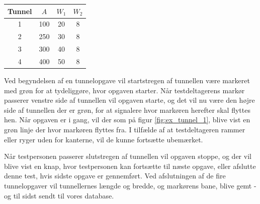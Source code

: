 \begin{center}
	\begin{tabular}{c c c c}
		Tunnel & $A$ & $W_1$ & $W_2$ \\
		\hline
		1 & 100 & 20 & 8 \\
		2 & 250 & 30 & 8\\
		3 & 300 & 40 & 8\\
		4 & 400 & 50 & 8\\
	\end{tabular}
	\label{tab:tunnelopgave}
\end{center}
Ved begyndelsen af en tunnelopgave vil startstregen af tunnellen være markeret med grøn for at tydeliggøre, hvor opgaven starter. Når testdeltagerens markør passerer venstre side af tunnellen vil opgaven starte, og det vil nu være den højre side af tunnellen der er grøn, for at signalere hvor markøren herefter skal flyttes hen. Når opgaven er i gang, vil der som på figur \ref{fig:ex_tunnel_1}, blive vist en grøn linje der hvor markøren flyttes fra. I tilfælde af at testdeltageren rammer eller ryger uden for kanterne, vil de kunne fortsætte ubemærket.

Når testpersonen passerer slutstregen af tunnellen vil opgaven stoppe, og der vil blive vist en knap, hvor testpersonen kan fortsætte til næste opgave, eller afslutte denne test, hvis sidste opgave er gennemført. Ved afslutningen af de fire tunnelopgaver vil tunnellernes længde og bredde, og markørens bane, blive gemt - og til sidst sendt til vores database.

